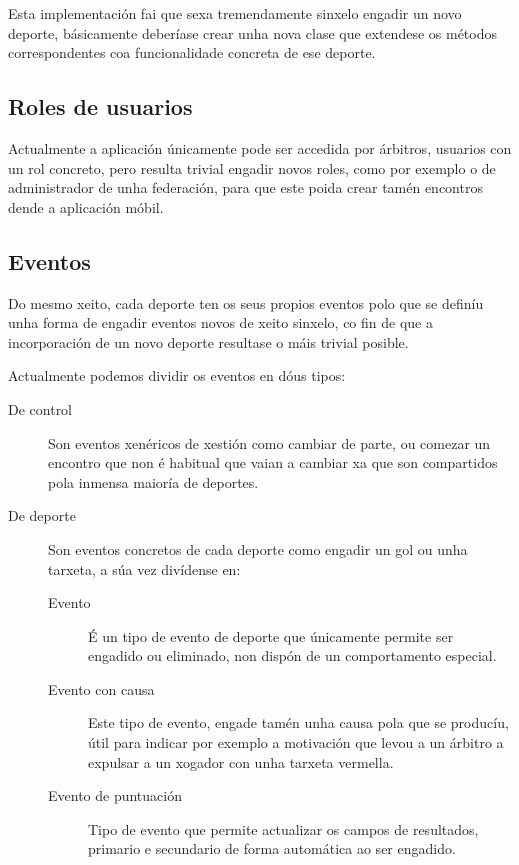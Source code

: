  Esta implementación fai que sexa tremendamente sinxelo engadir un novo 
deporte, básicamente deberíase crear unha nova clase que extendese os métodos 
correspondentes coa funcionalidade concreta de ese deporte.

  \subsection{Roles de usuarios}
  Actualmente a aplicación únicamente pode ser accedida por árbitros, usuarios 
con un rol concreto, pero resulta trivial engadir novos roles, como por exemplo 
o de administrador de unha federación, para que este poida crear tamén 
encontros dende a aplicación móbil.


  \subsection{Eventos}
  Do mesmo xeito, cada deporte ten os seus propios eventos polo que se definíu 
unha forma de engadir eventos novos de xeito sinxelo, co fin de que a 
incorporación de un novo deporte resultase o máis trivial posible.

  Actualmente podemos dividir os eventos en dóus tipos:

  \begin{description}
    \item [De control] Son eventos xenéricos de xestión como cambiar de parte, 
ou comezar un encontro que non é habitual que vaian a cambiar xa que son 
compartidos pola inmensa maioría de deportes.
    \item [De deporte] Son eventos concretos de cada deporte como engadir un gol 
ou unha tarxeta, a súa vez divídense en:
      \begin{description}
       \item [Evento] É un tipo de evento de deporte que únicamente permite ser 
engadido ou eliminado, non dispón de un comportamento especial.
       \item [Evento con causa] Este tipo de evento, engade tamén unha causa 
pola que se producíu, útil para indicar por exemplo a motivación que levou a 
un árbitro a expulsar a un xogador con unha tarxeta vermella.
         \item [Evento de puntuación] Tipo de evento que permite actualizar os 
campos de resultados, primario e secundario de forma automática ao ser engadido.
      \end{description}

  \end{description}

